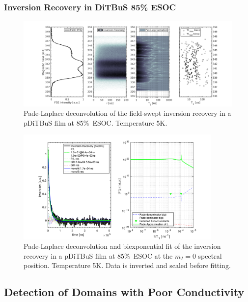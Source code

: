 \subsubsection{Inversion Recovery in DiTBuS 85\% ESOC}
\begin{figure}[h]
\center
	\includegraphics[width=1\textwidth]{./pulse/figures/Figure_S18.pdf}
	\caption{Pade-Laplace deconvolution of the field-swept inversion recovery in a pDiTBuS film at 85\%~ESOC. Temperature 5K.}
	\label{fig:Figure_S18}
\end{figure}


\begin{figure}[ht!]
\center
	\includegraphics[width=0.9\textwidth]{./pulse/figures/Figure_S19.pdf}
	\caption{Pade-Laplace deconvolution and biexponential fit of the inversion recovery in a pDiTBuS film at 85\%~ESOC at the $m_I=0$ spectral position. Temperature 5K. Data is inverted and scaled before fitting.}
	\label{fig:Figure_S19}
\end{figure}




\subsection{Detection of Domains with Poor Conductivity}
\label{sec:domains_distinction_by_relaxation}

